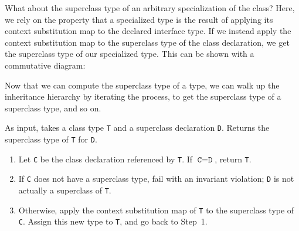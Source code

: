 \documentclass[../generics]{subfiles}
\begin{document}
What about the superclass type of an arbitrary specialization of the class? Here, we rely on the property that a specialized type is the result of applying its context substitution map to the declared interface type. If we instead apply the context substitution map to the superclass type of the class declaration, we get the superclass type of our specialized type. This can be shown with a commutative diagram:
\begin{quote}
\end{quote}

Now that we can compute the superclass type of a type, we can walk up the inheritance hierarchy by iterating the process, to get the superclass type of a superclass type, and so on.

\begin{algorithm}\label{superclassfordecl} As input, takes a class type \texttt{T} and a superclass declaration \texttt{D}. Returns the superclass type of \texttt{T} for \texttt{D}.
\begin{enumerate}
\item Let \texttt{C} be the class declaration referenced by \texttt{T}. If $\texttt{C}=\texttt{D}$, return \texttt{T}.
\item If \texttt{C} does not have a superclass type, fail with an invariant violation; \texttt{D} is not actually a superclass of \texttt{T}.
\item Otherwise, apply the context substitution map of \texttt{T} to the superclass type of \texttt{C}. Assign this new type to \texttt{T}, and go back to Step~1.
\end{enumerate}
\end{algorithm}
\end{document}
